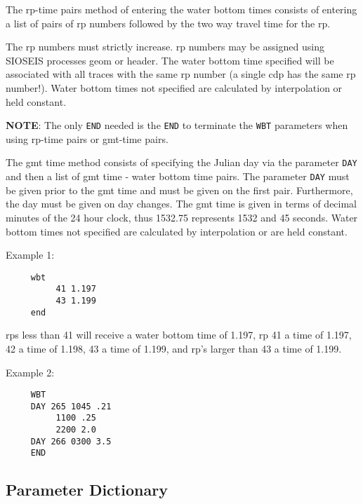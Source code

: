 The rp-time pairs method of entering the water bottom times
consists of entering a list of pairs of \gls{rp} numbers followed by the two
way travel time for the \gls{rp}.

The \gls{rp} numbers must strictly increase.  \Gls{rp} numbers may be assigned using
SIOSEIS processes geom or header.  The water bottom time specified will
be associated with all traces with the same \gls{rp} number (a single \gls{cdp} has
the same \gls{rp} number!).  Water bottom times not specified are calculated
by interpolation or held constant.

\textbf{NOTE}: The only \texttt{END} needed is the \texttt{END} to terminate the \texttt{WBT} parameters when
using rp-time pairs or \gls{gmt}-time pairs.

The \gls{gmt} time method consists of specifying the Julian day via the
parameter \texttt{DAY} and then a list of \gls{gmt} time - water bottom time pairs.
The parameter \texttt{DAY} must be given prior to the \gls{gmt} time and must be
given on the first pair.  Furthermore, the day must be given on day
changes.  The \gls{gmt} time is given in terms of decimal minutes of the 24
hour clock, thus 1532.75 represents 1532 and 45 seconds.  Water bottom
times not specified are calculated by interpolation or are held constant.

Example 1:
\begin{verbatim}
     wbt
          41 1.197
          43 1.199
     end
\end{verbatim}
\glspl{rp} less than 41 will receive a water bottom time of 1.197, \gls{rp} 41 a time
of 1.197, 42 a time of 1.198, 43 a time of 1.199, and \gls{rp}'s larger than
43 a time of 1.199.

Example 2:
\begin{verbatim}
     WBT
     DAY 265 1045 .21
          1100 .25
          2200 2.0
     DAY 266 0300 3.5
     END
\end{verbatim}

\subsection{Parameter Dictionary}

